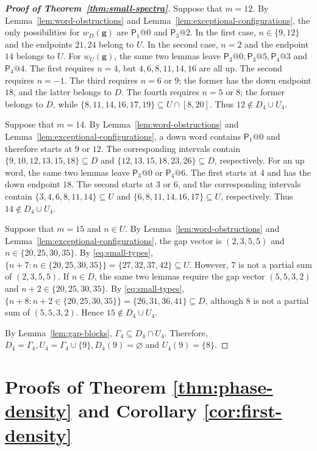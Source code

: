 \documentclass[11pt]{amsart}
\theoremstyle{definition}
\begin{document}
\begin{proof}[\bf Proof of Theorem~\ref{thm:small-spectra}]
Suppose that $m=12$. By Lemma~\ref{lem:word-obstructions} and
Lemma~\ref{lem:exceptional-configurations}, the only possibilities for
$w_D(\mathbf g)$ are $\mathsf P_1@0$ and $\mathsf P_3@2$. In the
first case, $n\in\{9,12\}$ and the endpoints $21,24$ belong to $U$.
In the second case, $n=2$ and the endpoint $14$ belongs to $U$.
For $w_U(\mathbf g)$, the same two lemmas leave $\mathsf P_3@0,\mathsf P_3@5,\mathsf P_4@3$ and $\mathsf P_4@4$.
The first requires $n=4$, but $4,6,8,11,14,16$ are all up. The second
requires $n=-1$. The third requires $n=6$ or $9$; the former has the
down endpoint $18$, and the latter belongs to $D$. The fourth requires
$n=5$ or $8$; the former belongs to $D$, while $\{8,11,14,16,17,19\}\subseteq U\cap[8,20]$.
Thus $12\notin D_4\cup U_4$.

Suppose that $m=14$. By Lemma~\ref{lem:word-obstructions} and
Lemma~\ref{lem:exceptional-configurations}, a down word contains
$\mathsf P_1@0$ and therefore starts at $9$ or $12$. The corresponding
intervals contain $\{9,10,12,13,15,18\}\subseteq D$ and $\{12,13,15,18,23,26\}\subseteq D$, respectively.
For an up word, the same two lemmas leave $\mathsf P_3@0$ or
$\mathsf P_4@6$. The first starts at $4$ and has the down endpoint
$18$. The second starts at $3$ or $6$, and the corresponding intervals
contain $\{3,4,6,8,11,14\}\subseteq U$ and $\{6,8,11,14,16,17\}\subseteq U$, respectively.
Thus $14\notin D_4\cup U_4$.

Suppose that $m=15$ and $n\in U$. By
Lemma~\ref{lem:word-obstructions} and
Lemma~\ref{lem:exceptional-configurations}, the gap vector is
$(2,3,5,5)$ and $n\in\{20,25,30,35\}$.
By \eqref{eq:small-types}, $\{n+7:n\in\{20,25,30,35\}\}=\{27,32,37,42\}\subseteq U$.
However, $7$ is not a partial sum of $(2,3,5,5)$. If $n\in D$, the
same two lemmas require the gap vector $(5,5,3,2)$ and $n+2\in\{20,25,30,35\}$.
By \eqref{eq:small-types}, $\{n+8:n+2\in\{20,25,30,35\}\}=\{26,31,36,41\}\subseteq D$,
although $8$ is not a partial sum of $(5,5,3,2)$. Hence
$15\notin D_4\cup U_4$.

By Lemma~\ref{lem:gap-blocks},
$\Gamma_4\subseteq D_4\cap U_4$. Therefore, $D_4=\Gamma_4, U_4=\Gamma_4\cup\{9\}, D_4(9)=\varnothing$ and $U_4(9)=\{8\}$.
\end{proof}


\section{Proofs of Theorem \ref{thm:phase-density} and Corollary \ref{cor:first-density}}\label{sec:density}
\end{document}
